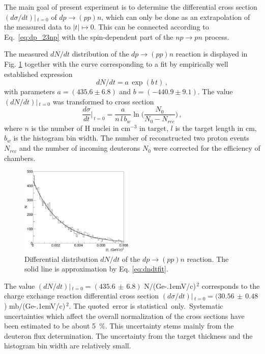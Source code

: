 \documentclass[twocolumn,epjc3]{svjour3}
\newcommand{\np}     {\ensuremath{np \rightarrow pn}\xspace}
\newcommand{\dpchex} {\ensuremath{dp \rightarrow (pp)n}\xspace}
\newcommand{\GeVc}   {Ge\kern-.1emV/c\xspace}
\begin{document}
The main goal of present experiment is to determine the differential cross
section $(d\sigma/dt)|\,_{t=0}$ of \dpchex, which can only be done as an
extrapolation of the measured data to $|t|\mapsto0$. This can be connected
according to Eq.~\eqref{eq:dp_23np} with the spin-dependent part of the \np
process.

The measured $dN/dt$ distribution of the \dpchex reaction is displayed in
Fig. \ref{fig:dndt} together with the curve corresponding to a fit by
empirically well established expression
\begin{equation}
  \label{eq:dndtfit}
  dN/dt = a\,\exp(b\,t)\,,
\end{equation}
with parameters $a=(435.6 \pm 6.8)$ and $b=(-440.9 \pm 9.1)$.
The value $(dN/dt)|\,_{t=0}$ was transformed to cross section
\begin{equation}
  \frac{d\sigma}{dt}\Big|_{\,t=0} =
  \frac{a}{n\,l\,b_w}\ln\bigg(\frac{N_0}{N_0-N_{rec}}\bigg)\,,
\end{equation}
where $n$ is the number of H nuclei in cm$^{-3}$ in target, $l$ is the target
length in cm, $b_w$ is the histogram bin width. The number of reconstructed two
proton events $N_{rec}$ and the number of incoming deuterons $N_0$ were
corrected for the efficiency of chambers.

\begin{figure}[h]
  \centering
  \includegraphics[width=0.48\textwidth]{dp_dN.pdf}
  \caption{Differential distribution $dN/dt$ of the \dpchex reaction. The solid
    line is approximation by Eq. \eqref{eq:dndtfit}.}
  \label{fig:dndt}
\end{figure}

The value $(dN/dt)|\,_{t=0}=(435.6\,\pm\,6.8)$ N$/$(\GeVc)$^{\,2}$ corresponds
to the charge exchange reaction differential cross section
$(d\sigma/dt)|\,_{t=0}=(30.56\,\pm\,0.48$) mb$/$(\GeVc)$^{\,2}$.
The quoted \,error is statistical \,only. \,Systematic uncertainties which
affect the overall normalization of the cross sections have been estimated to be
about 5~\%. This uncertainty stems mainly from the deuteron flux determination.
The uncertainty from the target thickness and the histogram bin width are
relatively small.
\end{document}
